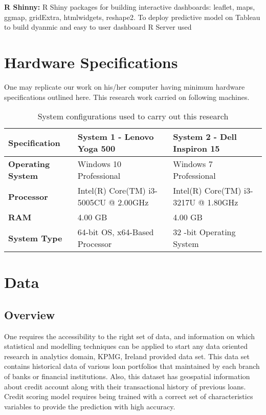 \begin{description}
\begin{description}
\end{description}

\textbf{R Shinny:} R Shiny packages for building interactive dashboards: leaflet, maps, ggmap, gridExtra, htmlwidgets, reshape2. To deploy predictive model on Tableau to build dyanmic and easy to user dashboard R Server used

\section{Hardware Specifications}

One may replicate our work on his/her computer having minimum hardware specifications outlined here. This research work carried on following machines. 
\begin{table}[!htb]
\centering
\caption{System configurations used to carry out this research}
\label{osc4}
\begin{tabular}{|p{3cm}|p{5cm}|p{5cm}|}
\toprule
\textbf{Specification}    & \textbf{System 1 - Lenovo Yoga 500}   & \textbf{System 2 - Dell Inspiron 15} \\ \midrule
\textbf{Operating System} & Windows 10 Professional               & Windows 7 Professional               \\
\textbf{Processor}        & Intel(R) Core(TM) i3-5005CU @ 2.00GHz & Intel(R) Core(TM) i3-3217U @ 1.80GHz \\
\textbf{RAM}              & 4.00 GB                               & 4.00 GB                              \\
\textbf{System Type}      & 64-bit OS, x64-Based Processor        & 32 -bit Operating System             \\ \bottomrule
\end{tabular}
\end{table}


\section{Data}\label{ch4.3}

\subsection{Overview}
One requires the accessibility to the right set of data, and information on which statistical and modelling techniques can be applied to start any data oriented research in analytics domain, KPMG, Ireland provided data set. This data set contains historical data of various loan portfolios that maintained by each branch of banks or financial institutions. Also, this dataset has geospatial information about credit account along with their transactional history of previous loans. Credit scoring model requires being trained with a correct set of characteristics variables to provide the prediction with high accuracy.


\end{description}
